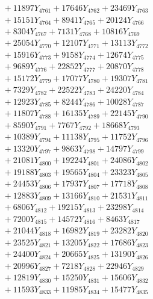 \documentclass[a4paper,10pt]{article}
\begin{document}
{\begin{align}
&\;  + 11897 Y_{4761} + 17646 Y_{4762} + 23469 Y_{4763} \\[0.3ex]
&\;  + 15151 Y_{4764} + 8941 Y_{4765} + 20124 Y_{4766} \\[0.3ex]
&\;  + 8304 Y_{4767} + 7131 Y_{4768} + 10816 Y_{4769} \\[0.5ex]\allowbreak
&\;  + 25054 Y_{4770} + 12107 Y_{4771} + 13113 Y_{4772} \\[0.3ex]
&\;  + 15916 Y_{4773} + 9158 Y_{4774} + 12674 Y_{4775} \\[0.3ex]
&\;  + 9689 Y_{4776} + 22852 Y_{4777} + 20870 Y_{4778} \\[0.3ex]
&\;  + 15172 Y_{4779} + 17077 Y_{4780} + 19307 Y_{4781} \\[0.3ex]
&\;  + 7329 Y_{4782} + 22522 Y_{4783} + 24220 Y_{4784} \\[0.3ex]
&\;  + 12923 Y_{4785} + 8244 Y_{4786} + 10028 Y_{4787} \\[0.3ex]
&\;  + 11807 Y_{4788} + 16135 Y_{4789} + 22145 Y_{4790} \\[0.3ex]
&\;  + 8590 Y_{4791} + 7767 Y_{4792} + 18668 Y_{4793} \\[0.3ex]
&\;  + 10389 Y_{4794} + 11138 Y_{4795} + 11752 Y_{4796} \\[0.3ex]
&\;  + 13320 Y_{4797} + 9863 Y_{4798} + 14797 Y_{4799} \\[0.5ex]\allowbreak
&\;  + 21081 Y_{4800} + 19224 Y_{4801} + 24086 Y_{4802} \\[0.3ex]
&\;  + 19188 Y_{4803} + 19565 Y_{4804} + 23323 Y_{4805} \\[0.3ex]
&\;  + 24453 Y_{4806} + 17937 Y_{4807} + 17718 Y_{4808} \\[0.3ex]
&\;  + 12883 Y_{4809} + 13166 Y_{4810} + 21531 Y_{4811} \\[0.3ex]
&\;  + 6806 Y_{4812} + 19215 Y_{4813} + 23298 Y_{4814} \\[0.3ex]
&\;  + 7200 Y_{4815} + 14572 Y_{4816} + 8463 Y_{4817} \\[0.3ex]
&\;  + 21044 Y_{4818} + 16982 Y_{4819} + 23282 Y_{4820} \\[0.3ex]
&\;  + 23525 Y_{4821} + 13205 Y_{4822} + 17686 Y_{4823} \\[0.3ex]
&\;  + 24400 Y_{4824} + 20665 Y_{4825} + 13190 Y_{4826} \\[0.3ex]
&\;  + 20996 Y_{4827} + 7218 Y_{4828} + 22946 Y_{4829} \\[0.5ex]\allowbreak
&\;  + 12819 Y_{4830} + 15250 Y_{4831} + 15606 Y_{4832} \\[0.3ex]
&\;  + 11593 Y_{4833} + 11985 Y_{4834} + 15477 Y_{4835} \\[0.3ex]

\end{align}}
\end{document}
